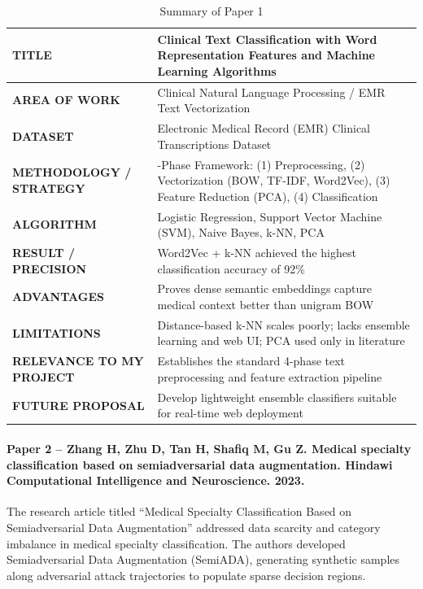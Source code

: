 \begin{table}[H]
\centering
\small
\setlength{\tabcolsep}{5pt}
\begin{tabularx}{\linewidth}{|>{\raggedright\arraybackslash}p{3.8cm}|>{\raggedright\arraybackslash}X|}
\hline
\textbf{TITLE} & Clinical Text Classification with Word Representation Features and Machine Learning Algorithms \cite{omar2023} \\
\hline
\textbf{AREA OF WORK} & Clinical Natural Language Processing / EMR Text Vectorization \\
\hline
\textbf{DATASET} & Electronic Medical Record (EMR) Clinical Transcriptions Dataset \\
\hline
\textbf{METHODOLOGY / STRATEGY} & 4-Phase Framework: (1) Preprocessing, (2) Vectorization (BOW, TF-IDF, Word2Vec), (3) Feature Reduction (PCA), (4) Classification \\
\hline
\textbf{ALGORITHM} & Logistic Regression, Support Vector Machine (SVM), Naive Bayes, k-NN, PCA \\
\hline
\textbf{RESULT / PRECISION} & Word2Vec + k-NN achieved the highest classification accuracy of 92\% \\
\hline
\textbf{ADVANTAGES} & Proves dense semantic embeddings capture medical context better than unigram BOW \\
\hline
\textbf{LIMITATIONS} & Distance-based k-NN scales poorly; lacks ensemble learning and web UI; PCA used only in literature \\
\hline
\textbf{RELEVANCE TO MY PROJECT} & Establishes the standard 4-phase text preprocessing and feature extraction pipeline \\
\hline
\textbf{FUTURE PROPOSAL} & Develop lightweight ensemble classifiers suitable for real-time web deployment \\
\hline
\end{tabularx}
\caption{Summary of Paper 1}
\label{tab:summary_paper1}
\end{table}

\paragraph{Paper 2 -- Zhang H, Zhu D, Tan H, Shafiq M, Gu Z. Medical specialty classification based on semiadversarial data augmentation. Hindawi Computational Intelligence and Neuroscience. 2023.}

The research article titled ``Medical Specialty Classification Based on Semiadversarial Data Augmentation'' addressed data scarcity and category imbalance in medical specialty classification. The authors developed Semiadversarial Data Augmentation (SemiADA), generating synthetic samples along adversarial attack trajectories to populate sparse decision regions.

